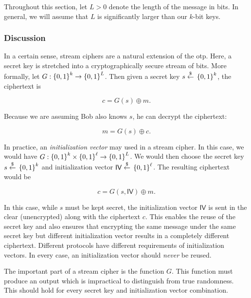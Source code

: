 Throughout this section, let $L>0$ denote the length of the message in bits.
In general, we will assume that $L$ is significantly larger
than our $k$-bit keys.

\subsubsection{Discussion}

In a certain sense, \glspl{stream cipher} are a natural extension of the
\gls{otp}.
Here, a secret key is stretched into a cryptographically secure
stream of bits.
More formally, let $G:\left\{ 0,1 \right\}^{k}\to\left\{ 0,1 \right\}^{L}$.
Then given a secret key $s\stackrel{\$}{\leftarrow}{}\left\{ 0,1 \right\}^{k}$,
the ciphertext is

\begin{equation}
    c = G(s)\oplus m.
\end{equation}

\noindent
Because we are assuming Bob also knows $s$, he can decrypt
the ciphertext:

\begin{equation}
    m = G(s)\oplus c.
\end{equation}

In practice, an \emph{\gls{initialization vector}} may used
in a \gls{stream cipher}.
In this case, we would have
$G:\left\{ 0,1 \right\}^{k}\times\left\{ 0,1 \right\}^{\ell}\to\left\{ 0,1 \right\}^{L}$.
We would then choose the secret key $s\stackrel{\$}{\leftarrow}{}\left\{ 0,1 \right\}^{k}$
and \gls{initialization vector} $\textsf{IV}\stackrel{\$}{\leftarrow}{}\left\{ 0,1 \right\}^{\ell}$.
The resulting ciphertext would be

\begin{equation}
    c = G(s,\textsf{IV})\oplus m.
\end{equation}

\noindent
In this case, while $s$ must be kept secret,
the \gls{initialization vector} $\textsf{IV}$ is sent
in the clear (unencrypted) along with the ciphertext $c$.
This enables the reuse of the secret key and also ensures
that encrypting the same message under the same secret key
but different \gls{initialization vector} results in a completely different
ciphertext.
Different protocols have different requirements of
\glspl{initialization vector}.
In every case, an \gls{initialization vector} should \emph{never}
be reused.

The important part of a \gls{stream cipher} is the function $G$.
This function must produce an output which is impractical
to distinguish from true randomness.
This should hold for every secret key and \gls{initialization vector}
combination.

